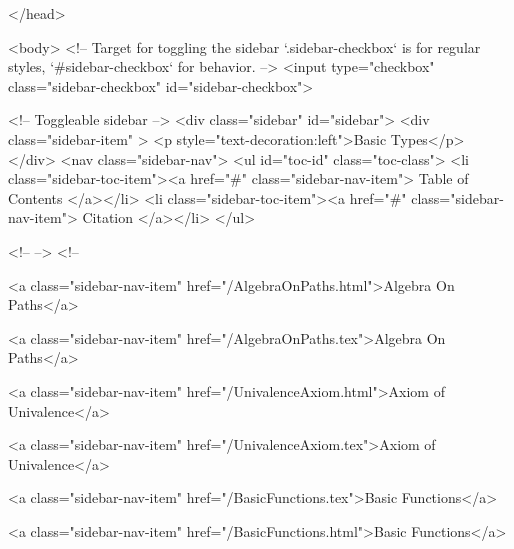   
</head>




  <body>
    <!-- Target for toggling the sidebar `.sidebar-checkbox` is for regular
     styles, `#sidebar-checkbox` for behavior. -->
<input type="checkbox" class="sidebar-checkbox" id="sidebar-checkbox">

<!-- Toggleable sidebar -->
<div class="sidebar" id="sidebar">
  <div class="sidebar-item" >
    <p style="text-decoration:left">Basic Types</p>
  </div>
  <nav class="sidebar-nav">
    <ul id="toc-id" class="toc-class">
  <li class="sidebar-toc-item"><a href="#" class="sidebar-nav-item"> Table of Contents </a></li>
  <li class="sidebar-toc-item"><a href="#" class="sidebar-nav-item"> Citation </a></li>
</ul>


    <!--  -->
    <!-- 
      
    
      
    
      
    
      
        
      
    
      
        
          <a class="sidebar-nav-item" href="/AlgebraOnPaths.html">Algebra On Paths</a>
        
      
    
      
        
          <a class="sidebar-nav-item" href="/AlgebraOnPaths.tex">Algebra On Paths</a>
        
      
    
      
        
          <a class="sidebar-nav-item" href="/UnivalenceAxiom.html">Axiom of Univalence</a>
        
      
    
      
        
          <a class="sidebar-nav-item" href="/UnivalenceAxiom.tex">Axiom of Univalence</a>
        
      
    
      
        
          <a class="sidebar-nav-item" href="/BasicFunctions.tex">Basic Functions</a>
        
      
    
      
        
          <a class="sidebar-nav-item" href="/BasicFunctions.html">Basic Functions</a>
        
      
    
      
        
